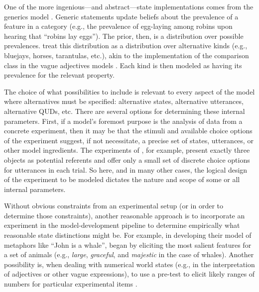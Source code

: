 \documentclass{sp}
\begin{document}
One of the more ingenious---and abstract---state implementations comes from the generics model \citep{tesslergoodman2019}. Generic statements update beliefs about the prevalence of a feature in a category (e.g., the prevalence of egg-laying among robins upon hearing that ``robins lay eggs''). The prior, then, is a distribution over possible prevalences. \citeauthor{tesslergoodman2019} treat this distribution as a distribution over alternative kinds (e.g., bluejays, horses, tarantulas, etc.), akin to the implementation of the comparison class in the vague adjectives models \citep{lassitergoodman2013, tessler2017comparisonclass}. Each kind is then modeled as having its prevalence for the relevant property.

The choice of what possibilities to include is relevant to every aspect of the model where alternatives must be specified: alternative states, alternative utterances, alternative QUDs, etc.
There are several options for determining these internal parameters.
First, if a model's foremost purpose is the analysis of data from a concrete experiment, then it may be that the stimuli and available choice options of the experiment suggest, if not necessitate, a precise set of states, utterances, or other model ingredients.
The experiments of \citet{frankgoodman2012}, for example, present exactly three objects as potential referents and offer only a small set of discrete choice options for utterances in each trial.
So here, and in many other cases, the logical design of the experiment to be modeled dictates the nature and scope of some or all internal parameters.

Without obvious constraints from an experimental setup (or in order to determine those constraints), another reasonable approach is to incorporate an experiment in the model-development pipeline to determine empirically what reasonable state distinctions might be. For example, in developing their model of metaphors like ``John is a whale'', \cite{kaoetal2014metaphor} began by eliciting the most salient features for a set of animals (e.g., \emph{large}, \emph{graceful}, and \emph{majestic} in the case of whales).
Another possibility is, when dealing with numerical world states (e.g., in the interpretation of adjectives or other vague expressions), to use a pre-test to elicit likely ranges of numbers for particular experimental items \citep[e.g.,][]{FrankeScholler2016:Semantic-values}.
\end{document}
